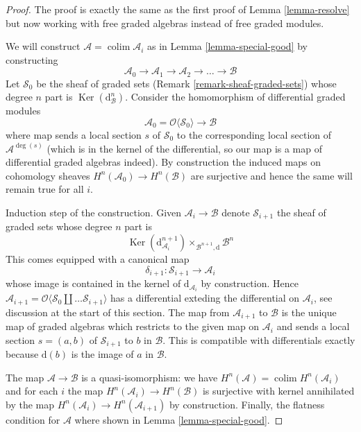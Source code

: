 \documentclass[10pt,a4paper]{amsart}
\theoremstyle{plain}
\theoremstyle{definition}
\theoremstyle{remark}
\numberwithin{equation}{subsection}
\def\colim{\mathop{\mathrm{colim}}\nolimits}
\def\Ker{\mathop{\mathrm{Ker}}}
\begin{document}
\begin{proof}
The proof is exactly the same as the first proof of
Lemma \ref{lemma-resolve} but now working with free graded
algebras instead of free graded modules.

\medskip\noindent
We will construct $\mathcal{A} = \colim \mathcal{A}_i$ as in
Lemma \ref{lemma-special-good} by constructing
$$
\mathcal{A}_0 \to \mathcal{A}_1 \to \mathcal{A}_2 \to \ldots \to \mathcal{B}
$$
Let $\mathcal{S}_0$ be the sheaf of graded sets
(Remark \ref{remark-sheaf-graded-sets})
whose degree $n$ part is $\Ker(\text{d}_\mathcal{B}^n)$.
Consider the homomorphism of differential
graded modules
$$
\mathcal{A}_0 = \mathcal{O}\langle \mathcal{S}_0 \rangle
\longrightarrow
\mathcal{B}
$$
where map sends a local section $s$ of $\mathcal{S}_0$
to the corresponding local section of $\mathcal{A}^{\deg(s)}$
(which is in the kernel of the differential, so our map is
a map of differential graded algebras indeed). By construction the
induced maps on cohomology sheaves $H^n(\mathcal{A}_0) \to H^n(\mathcal{B})$
are surjective and hence the same will remain true for all $i$.

\medskip\noindent
Induction step of the construction. Given $\mathcal{A}_i \to \mathcal{B}$
denote $\mathcal{S}_{i + 1}$ the sheaf of graded sets whose degree $n$ part is
$$
\Ker(\text{d}_{\mathcal{A}_i}^{n + 1})
\times_{\mathcal{B}^{n + 1}, \text{d}}
\mathcal{B}^n
$$
This comes equipped with a canonical map
$$
\delta_{i + 1} : \mathcal{S}_{i + 1} \longrightarrow
\mathcal{A}_i
$$
whose image is contained in the kernel of $\text{d}_{\mathcal{A}_i}$
by construction. Hence $\mathcal{A}_{i + 1} = \mathcal{O}\langle
\mathcal{S}_0 \amalg \ldots \mathcal{S}_{i + 1}\rangle$ has a differential
exteding the differential on $\mathcal{A}_i$, see discussion at the
start of this section. The map from $\mathcal{A}_{i + 1}$ to
$\mathcal{B}$ is the unique map of graded algebras which
restricts to the given map on $\mathcal{A}_i$ and sends
a local section $s = (a, b)$ of $\mathcal{S}_{i + 1}$
to $b$ in $\mathcal{B}$. This is compatible with differentials
exactly because $\text{d}(b)$ is the image of $a$ in $\mathcal{B}$.

\medskip\noindent
The map $\mathcal{A} \to \mathcal{B}$ is a quasi-isomorphism:
we have $H^n(\mathcal{A}) = \colim H^n(\mathcal{A}_i)$
and for each $i$ the map $H^n(\mathcal{A}_i) \to H^n(\mathcal{B})$
is surjective with kernel annihilated by the map
$H^n(\mathcal{A}_i) \to H^n(\mathcal{A}_{i + 1})$ by construction.
Finally, the flatness condition for $\mathcal{A}$ where shown in
Lemma \ref{lemma-special-good}.
\end{proof}
\end{document}
